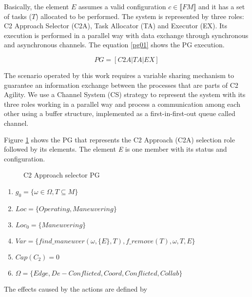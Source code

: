 Basically, the element $E$ assumes a valid configuration $c \in \llbracket FM \rrbracket$ and it has a set of tasks ($T$) allocated to be performed. The system is represented by three roles: C2 Approach Selector (C2A), Task Allocator (TA) and Executor (EX). Its execution is performed in a parallel way with data exchange through synchronous and asynchronous channels. The equation \eqref{pg01} shows the PG execution.

\begin{equation}
\label{pg01}
    PG = [C2A | TA | EX]
\end{equation}

The scenario operated by this work requires a variable sharing mechanism to guarantee an information exchange between the processes that are parts of C2 Agility.  We use a Channel System (CS) strategy to represent the system with its three roles working in a parallel way and process a communication among each other using a buffer structure, implemented as a first-in-first-out queue called channel.

Figure \ref{c2a} shows the PG that represents the C2 Approach (C2A) selection role followed by its elements. The element \textit{E} is one member with its status and configuration.

\begin{figure}[h]
\centering

\label{c2a}
\caption{C2 Approach selector PG}
\end{figure}

\begin{enumerate}
    \item $g_0=\{\omega\in\Omega,T\subseteq M\} $
    
    \item $Loc=\{Operating, Maneuvering\} $
    
    \item $Loc_0=\{Maneuvering\} $
    
    \item $Var=\{find\_maneuver(\omega,\{E\},T), f\_remove(T), \omega, T, E\} $
    
    \item $Cap(C_2)=0 $
    
    \item $\Omega=\{Edge, De-Conflicted, Coord, Conflicted, Collab \}$
    
\end{enumerate}

The effects caused by the actions are defined by


